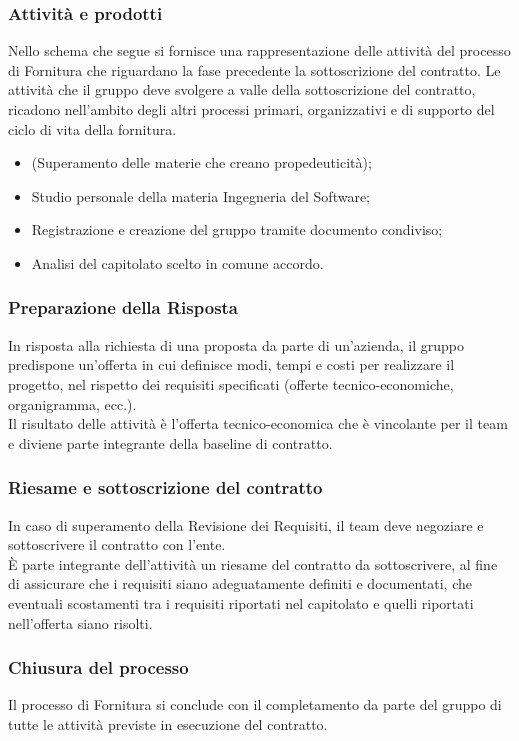 \documentclass[12pt,a4paper,titlepage]{article}
\begin{document}
\subsubsection{Attività e prodotti}
Nello schema che segue si fornisce una rappresentazione delle attività del processo di Fornitura che riguardano la fase precedente la sottoscrizione del contratto. Le attività che il gruppo deve svolgere a valle della sottoscrizione del contratto, ricadono nell'ambito degli altri processi primari, organizzativi e di supporto del ciclo di vita della fornitura.
\begin{itemize}
	\item (Superamento delle materie che creano propedeuticità);
	\item Studio personale della materia Ingegneria del Software;
	\item Registrazione e creazione del gruppo tramite documento condiviso;
	\item Analisi del capitolato scelto in comune accordo.
\end{itemize}
\subsubsection{Preparazione della Risposta}
In risposta alla richiesta di una proposta da parte di un'azienda, il gruppo predispone un'offerta in cui definisce modi, tempi e costi per realizzare il progetto, nel rispetto dei requisiti specificati (offerte tecnico-economiche, organigramma, ecc.).\\
Il risultato delle attività è l'offerta tecnico-economica che è vincolante per il team e diviene parte integrante della baseline di contratto.
\subsubsection{Riesame e sottoscrizione del contratto}
In caso di superamento della Revisione dei Requisiti, il team deve negoziare e sottoscrivere il contratto con l'ente.\\
È parte integrante dell'attività un riesame del contratto da sottoscrivere, al fine di assicurare che i requisiti siano adeguatamente definiti e documentati, che eventuali scostamenti tra i requisiti riportati nel capitolato e quelli riportati nell'offerta siano risolti.
\subsubsection{Chiusura del processo}
Il processo di Fornitura si conclude con il completamento da parte del gruppo di tutte le attività previste in esecuzione del contratto.
\end{document}
